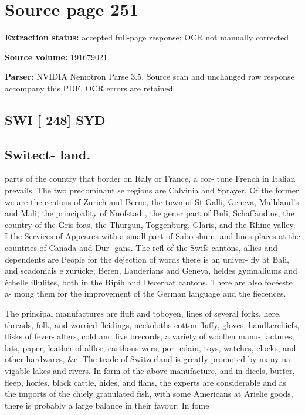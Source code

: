 \clearpage
\section{Source page 251}
\textbf{Extraction status:} accepted full-page response; OCR not manually corrected\par
\textbf{Source volume:} 191679021\par
\textbf{Parser:} NVIDIA Nemotron Parse 3.5. Source scan and unchanged raw response accompany this PDF. OCR errors are retained.\par\medskip
\subsection*{SWI [ 248] SYD}
\subsection*{Switect- land.}
parts of the country that border on Italy or France, a cor-
tune French in Italian prevails. The two predominant se
regions are Calvinia and Sprayer. Of the former we are the
centons of Zurich and Berne, the town of St Galli, Geneva, Malhland’s and Mali, the principality of Nuofstadt, the
gener part of Buli, Schaffaudins, the country of the Gris
foas, the Thurgun, Toggenburg, Glaris, and the Rhine valley. I
the Services of Appeares with a small part of Sabo
shum, and lines places at the countries of Canada and Dur-
gans. The refl of the Swifs cantons, allies and dependents
are People for the dejection of words there is an univer-
fly at Bali, and scadoniais e zurücke, Beren, Lauderians and
Geneva, heldes gymnaliums and échelle illulites, both in the
Ripih and Decerbat cantons. There are also focéeste a-
mong them for the improvement of the German language
and the fiecences.\par\medskip
The principal manufactures are fluff and toboyen, lines
of several forks, here, threads, folk, and worried fleidings,
neckoloths cotton fluffy, gloves, handkerchiefs, flisks of fever-
alters, cold and five brecords, a variety of woollen manu-
factures, lats, paper, leather of alflor, earthous wers, por-
edain, toys, watches, clocks, and other hardwares, \&c.
The trade of Switzerland is greatly promoted by many na-
vigable lakes and rivers. In form of the above manufacture,
and in dieels, butter, fleep, horfes, black cattle, hides, and
flans, the experts are considerable and as the imports of the
chiely granulated fish, with some Americans at Arielie goods,
there is probably a large balance in their favour. In fome
